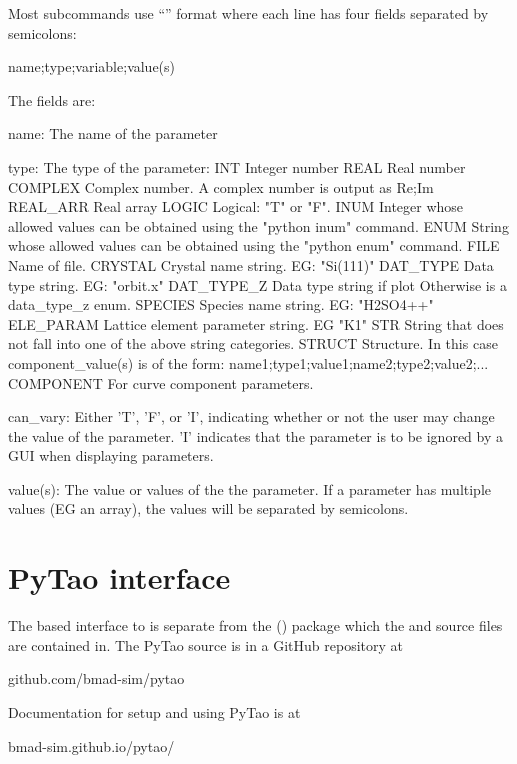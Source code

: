 Most  subcommands use ``'' format where each line has four fields
separated by semicolons:
\begin{example}
  {name};{type};{variable};{value(s)}
\end{example}
The fields are:
\begin{example}
    name:       The name of the parameter

    type:       The type of the parameter:
        INT           Integer number
        REAL          Real number
        COMPLEX       Complex number. A complex number is output as Re;Im
        REAL_ARR      Real array
        LOGIC         Logical: "T" or "F".
        INUM          Integer whose allowed values can be obtained 
                        using the "python inum" command.
        ENUM          String whose allowed values can be obtained 
                        using the "python enum" command.
        FILE          Name of file.
        CRYSTAL       Crystal name string. EG: "Si(111)"
        DAT_TYPE      Data type string. EG: "orbit.x"
        DAT_TYPE_Z    Data type string if plot%
                        Otherwise is a data_type_z enum.
        SPECIES       Species name string. EG: "H2SO4++"
        ELE_PARAM     Lattice element parameter string. EG "K1"
        STR           String that does not fall into one of the above string categories.
        STRUCT        Structure. In this case {component_value(s)} is of the form:
                        {name1};{type1};{value1};{name2};{type2};{value2};...
        COMPONENT     For curve component parameters.

    can_vary:   Either 'T', 'F', or 'I', indicating whether or not the
                user may change the value of the parameter. 'I' indicates
                that the parameter is to be ignored by a GUI when displaying parameters.

    value(s):   The value or values of the the parameter. If a parameter has multiple
                values (EG an array), the values will be separated by semicolons.
\end{example}

\section{PyTao interface}
\label{s:pytao}

The  based  interface to \tao is separate from the 
() package which the \bmad and \tao source files are contained in.
The PyTao source is in a GitHub repository at
\begin{example}
  github.com/bmad-sim/pytao
\end{example}
Documentation for setup and using PyTao is at
\begin{example}
  bmad-sim.github.io/pytao/
\end{example}

